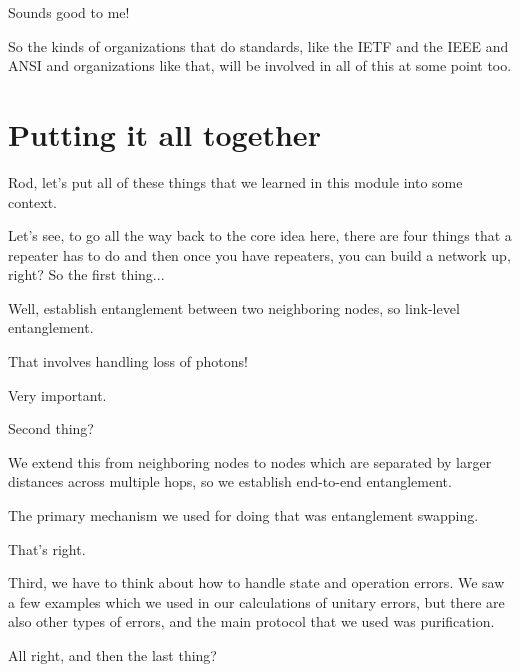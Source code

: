 \rrr Sounds good to me!

So the kinds of organizations that do standards, like the IETF and the IEEE and ANSI and organizations like that, will be involved in all of this at some point too.

\section{Putting it all together}


\mmm Rod, let's put all of these things that we learned in this module into some context.



\rrr Let's see, to go all the way back to the core idea here, there are four things that a repeater has to do and then once you have repeaters, you can build a network up, right? So the first thing...

\mmm Well, establish entanglement between two neighboring nodes, so link-level entanglement.

\rrr That involves handling loss of photons!

\mmm Very important.

\rrr Second thing?

\mmm We extend this from neighboring nodes to nodes which are separated by larger distances across multiple hops, so we establish end-to-end entanglement.

\rrr The primary mechanism we used for doing that was entanglement swapping. 

\mmm That's right.

Third, we have to think about how to handle state and operation errors. We saw a few examples which we used in our calculations of unitary errors, but there are also other types of errors, and the main protocol that we used was purification.

\rrr All right, and then the last thing?

